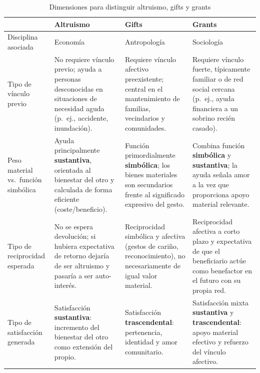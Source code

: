 \documentclass[a4paper,11pt]{article}
\begin{document}
\begin{table}
    \centering
    \caption{Dimensiones para distinguir altruismo, gifts y grants}
    \label{tab:tipos-cooperacion-khalil}
    \begin{tabular}{p{4cm} p{3.5cm} p{3.5cm} p{3.5cm}}
        \toprule
        & \textbf{Altruismo} & \textbf{Gifts} & \textbf{Grants} \\
        \midrule
        Disciplina asociada
        & Economía
        & Antropología
        & Sociología \\
        \midrule
        Tipo de vínculo previo 
        & No requiere vínculo previo; ayuda a personas desconocidas en situaciones de necesidad aguda (p.\ ej., accidente, inundación).
        & Requiere vínculo afectivo preexistente; central en el mantenimiento de familias, vecindarios y comunidades.
        & Requiere vínculo fuerte, típicamente familiar o de red social cercana (p.\ ej., ayuda financiera a un sobrino recién casado). \\
        \midrule
        Peso material vs.\ función simbólica 
        & Ayuda principalmente \textbf{sustantiva}, orientada al bienestar del otro y calculada de forma eficiente (coste/beneficio).
        & Función primordialmente \textbf{simbólica}; los bienes materiales son secundarios frente al significado expresivo del gesto.
        & Combina función \textbf{simbólica} y \textbf{sustantiva}; la ayuda señala amor a la vez que proporciona apoyo material relevante. \\
        \midrule
        Tipo de reciprocidad esperada 
        & No se espera devolución; si hubiera expectativa de retorno dejaría de ser altruismo y pasaría a ser auto-interés.
        & Reciprocidad simbólica y afectiva (gestos de cariño, reconocimiento), no necesariamente de igual valor material.
        & Reciprocidad afectiva a corto plazo y expectativa de que el beneficiario actúe como benefactor en el futuro con su propia red. \\
        \midrule
        Tipo de satisfacción generada 
        & Satisfacción \textbf{sustantiva}: incremento del bienestar del otro como extensión del propio.
        & Satisfacción \textbf{trascendental}: pertenencia, identidad y amor comunitario.
        & Satisfacción mixta \textbf{sustantiva} y \textbf{trascendental}: apoyo material efectivo y refuerzo del vínculo afectivo. \\
        \bottomrule
    \end{tabular}
\end{table}
\end{document}
